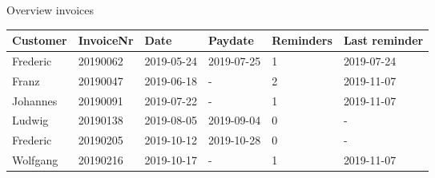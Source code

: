 \documentclass[a4paper]{article}
\begin{document}
\large{Overview invoices}

\vspace{8mm}

\begin{tabular}{llllll}\\ \hline
{\bfseries Customer} &
{\bfseries InvoiceNr} &
{\bfseries Date} &
{\bfseries Paydate} &
{\bfseries Reminders} &
{\bfseries Last reminder} \\ \hline\hline
Frederic &20190062 &2019-05-24 &2019-07-25 &1 &2019-07-24 \\Franz &20190047 &2019-06-18 &- &2 &2019-11-07 \\Johannes &20190091 &2019-07-22 &- &1 &2019-11-07 \\Ludwig &20190138 &2019-08-05 &2019-09-04 &0 &- \\Frederic &20190205 &2019-10-12 &2019-10-28 &0 &- \\Wolfgang &20190216 &2019-10-17 &- &1 &2019-11-07\\\hline
\end{tabular}
\end{document}

